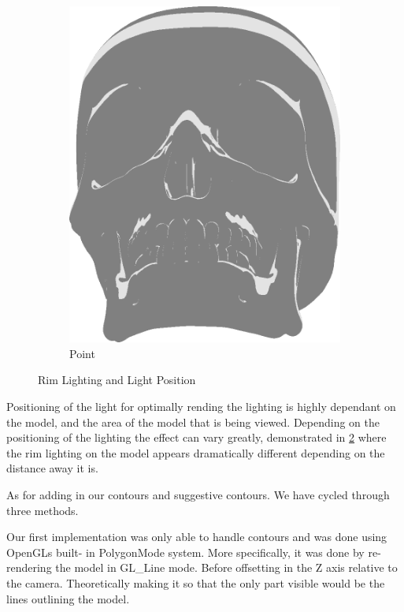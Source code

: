 \begin{figure}[h]
\begin{subfigure}[b]{0.18\textwidth}
        \includegraphics[width=\textwidth]{img/Lighting/Point.png}
        \caption{Point}
        \label{fig:LightingPosPos}
    \end{subfigure}
\caption{Rim Lighting and Light Position}
 \label{fig:LightingPosRim}
 \end{figure}

Positioning of the light for optimally rending the lighting is highly dependant on the model, and the area of the model that is being viewed. Depending on the positioning of the lighting the effect can vary greatly, demonstrated in \ref{fig:LightingPosRim} where the rim lighting on the model appears dramatically different depending on the distance away it is.

As for adding in our contours and suggestive contours. We have cycled through three methods.

Our first implementation was only able to handle contours and was done using OpenGLs built- in PolygonMode system. More specifically, it was done by re-rendering the model in GL_Line mode. Before offsetting in the Z axis relative to the camera. Theoretically making it so that the only part visible would be the lines outlining the model.

